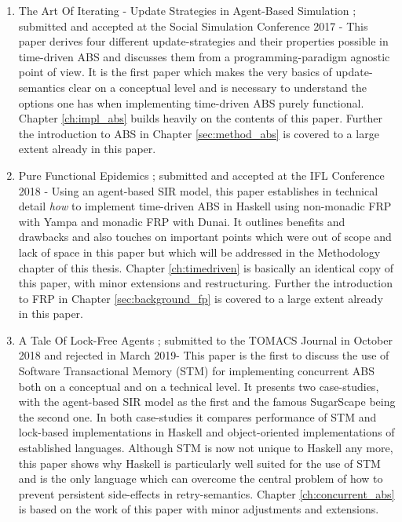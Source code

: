 \begin{enumerate}
	\item The Art Of Iterating - Update Strategies in Agent-Based Simulation \cite{thaler_art_2017}; submitted and accepted at the Social Simulation Conference 2017 - This paper derives four different update-strategies and their properties possible in time-driven ABS and discusses them from a programming-paradigm agnostic point of view. It is the first paper which makes the very basics of update-semantics clear on a conceptual level and is necessary to understand the options one has when implementing time-driven ABS purely functional. Chapter \ref{ch:impl_abs} builds heavily on the contents of this paper. Further the introduction to ABS in Chapter \ref{sec:method_abs} is covered to a large extent already in this paper.
	
	\item Pure Functional Epidemics \cite{thaler_pure_2018}; submitted and accepted at the IFL Conference 2018 - Using an agent-based SIR model, this paper establishes in technical detail \textit{how} to implement time-driven ABS in Haskell using non-monadic FRP with Yampa and monadic FRP with Dunai. It outlines benefits and drawbacks and also touches on important points which were out of scope and lack of space in this paper but which will be addressed in the Methodology chapter of this thesis. Chapter \ref{ch:timedriven} is basically an identical copy of this paper, with minor extensions and restructuring. Further the introduction to FRP in Chapter \ref{sec:background_fp} is covered to a large extent already in this paper.
	
	\item A Tale Of Lock-Free Agents \cite{thaler_tale_2018}; submitted to the TOMACS Journal in October 2018 and rejected in March 2019- This paper is the first to discuss the use of Software Transactional Memory (STM) for implementing concurrent ABS both on a conceptual and on a technical level. It presents two case-studies, with the agent-based SIR model as the first and the famous SugarScape being the second one. In both case-studies it compares performance of STM and lock-based implementations in Haskell and object-oriented implementations of established languages. Although STM is now not unique to Haskell any more, this paper shows why Haskell is particularly well suited for the use of STM and is the only language which can overcome the central problem of how to prevent persistent side-effects in retry-semantics. Chapter \ref{ch:concurrent_abs} is based on the work of this paper with minor adjustments and extensions.


\end{enumerate}

